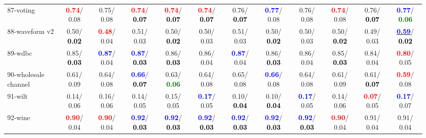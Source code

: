 \begin{table}[h]
\begin{center}
{\begin{tabular}{lc|c|c|c|c|c|c|c|c|c|c}
87-voting & \textcolor{red}{\textbf{  0.74}}/  0.08 &   0.75/  0.08 & \textcolor{red}{\textbf{  0.74}}/\textcolor{black}{\textbf{  0.07}} & \textcolor{red}{\textbf{  0.74}}/\textcolor{black}{\textbf{  0.07}} & \textcolor{red}{\textbf{  0.74}}/\textcolor{black}{\textbf{  0.07}} &   0.76/\textcolor{black}{\textbf{  0.07}} & \textcolor{blue}{\textbf{  0.77}}/  0.08 &   0.76/  0.08 & \textcolor{red}{\textbf{  0.74}}/  0.08 &   0.76/\textcolor{black}{\textbf{  0.07}} & \textcolor{blue}{\textbf{  0.77}}/\textcolor{darkgreen}{\textbf{  0.06}} \\
88-waveform v2 &   0.50/\textcolor{black}{\textbf{  0.02}} & \textcolor{red}{\textbf{  0.48}}/  0.04 &   0.51/  0.03 &   0.50/\textcolor{black}{\textbf{  0.02}} &   0.50/  0.03 &   0.51/  0.03 &   0.50/\textcolor{black}{\textbf{  0.02}} &   0.50/  0.03 &   0.50/\textcolor{black}{\textbf{  0.02}} &   0.49/  0.03 & \underline{\textcolor{blue}{\textbf{  0.59}}}/\textcolor{black}{\textbf{  0.02}} \\
89-wdbc &   0.85/\textcolor{black}{\textbf{  0.03}} & \textcolor{blue}{\textbf{  0.87}}/  0.04 & \textcolor{blue}{\textbf{  0.87}}/\textcolor{black}{\textbf{  0.03}} &   0.86/\textcolor{black}{\textbf{  0.03}} &   0.86/  0.04 & \textcolor{blue}{\textbf{  0.87}}/  0.04 &   0.86/\textcolor{black}{\textbf{  0.03}} &   0.86/  0.04 &   0.85/\textcolor{black}{\textbf{  0.03}} &   0.84/  0.04 & \textcolor{red}{\textbf{  0.80}}/  0.05 \\
90-wholesale channel &   0.61/  0.09 &   0.64/  0.08 & \textcolor{blue}{\textbf{  0.66}}/\textcolor{black}{\textbf{  0.07}} &   0.63/\textcolor{darkgreen}{\textbf{  0.06}} &   0.64/  0.08 &   0.65/  0.08 & \textcolor{blue}{\textbf{  0.66}}/  0.08 &   0.64/  0.08 &   0.61/  0.09 &   0.61/\textcolor{black}{\textbf{  0.07}} & \textcolor{red}{\textbf{  0.59}}/  0.08 \\
91-wilt &   0.14/  0.06 &   0.16/  0.06 &   0.14/  0.05 &   0.15/  0.05 & \textcolor{blue}{\textbf{  0.17}}/  0.05 &   0.10/\textcolor{black}{\textbf{  0.04}} &   0.10/\textcolor{black}{\textbf{  0.04}} & \textcolor{blue}{\textbf{  0.17}}/  0.05 &   0.14/  0.06 & \textcolor{red}{\textbf{  0.07}}/  0.05 & \textcolor{blue}{\textbf{  0.17}}/  0.07 \\
92-wine & \textcolor{red}{\textbf{  0.90}}/  0.04 & \textcolor{red}{\textbf{  0.90}}/  0.04 & \textcolor{blue}{\textbf{  0.92}}/\textcolor{black}{\textbf{  0.03}} & \textcolor{blue}{\textbf{  0.92}}/\textcolor{black}{\textbf{  0.03}} & \textcolor{blue}{\textbf{  0.92}}/\textcolor{black}{\textbf{  0.03}} & \textcolor{blue}{\textbf{  0.92}}/\textcolor{black}{\textbf{  0.03}} & \textcolor{blue}{\textbf{  0.92}}/\textcolor{black}{\textbf{  0.03}} & \textcolor{blue}{\textbf{  0.92}}/\textcolor{black}{\textbf{  0.03}} & \textcolor{red}{\textbf{  0.90}}/  0.04 &   0.91/  0.04 &   0.91/  0.04 \\ \hline

\end{tabular}}
\end{center}
\end{table}
